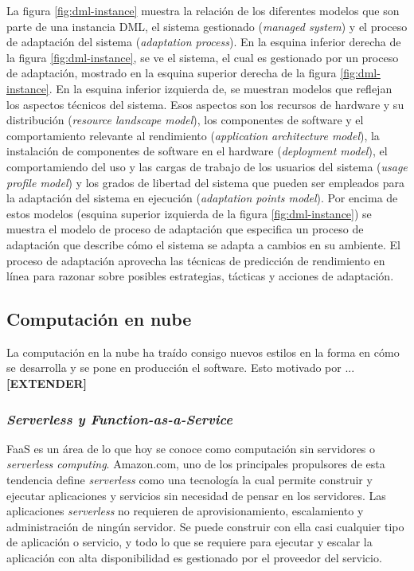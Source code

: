 La figura \ref{fig:dml-instance} muestra la relación de los diferentes modelos que son parte de una instancia DML, el sistema gestionado (\emph{managed system}) y el proceso de adaptación del sistema (\emph{adaptation process}). En la esquina inferior derecha de la figura \ref{fig:dml-instance}, se ve el sistema, el cual es gestionado por un proceso de adaptación, mostrado en la esquina superior derecha de la figura \ref{fig:dml-instance}. En la esquina inferior izquierda de, se muestran modelos que reflejan los aspectos técnicos del sistema. Esos aspectos son los recursos de hardware y su distribución (\emph{resource landscape model}), los componentes de software y el comportamiento relevante al rendimiento (\emph{application architecture model}), la instalación de componentes de software en el hardware (\emph{deployment model}), el comportamiendo del uso y las cargas de trabajo de los usuarios del sistema (\emph{usage profile model}) y los grados de libertad del sistema que pueden ser empleados para la adaptación del sistema en ejecución (\emph{adaptation points model}). Por encima de estos modelos (esquina superior izquierda de la figura \ref{fig:dml-instance}) se muestra el modelo de proceso de adaptación que especifica un proceso de adaptación que describe cómo el sistema se adapta a cambios en su ambiente. El proceso de adaptación aprovecha las técnicas de predicción de rendimiento en línea para razonar sobre posibles estrategias, tácticas y acciones de adaptación.
 
\subsection{Computación en nube}
La computación en la nube ha traído consigo nuevos estilos en la forma en cómo se desarrolla y se pone en producción el software. Esto motivado por ... \textbf{[EXTENDER]}

\subsubsection{\emph{Serverless y Function-as-a-Service}}
FaaS es un área de lo que hoy se conoce como computación sin servidores o \emph{serverless computing}. Amazon.com, uno de los principales propulsores de esta tendencia define \emph{serverless} como una tecnología la cual permite construir y ejecutar aplicaciones y servicios sin necesidad de pensar en los servidores. Las aplicaciones \emph{serverless} no requieren de aprovisionamiento, escalamiento y administración de ningún servidor. Se puede construir con ella casi cualquier tipo de aplicación o servicio, y todo lo que se requiere para ejecutar y escalar la aplicación con alta disponibilidad es gestionado por el proveedor del servicio\cite{amazon:serverless-definition}. 

